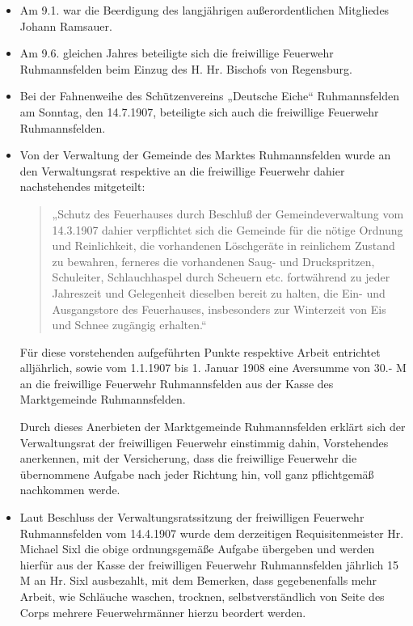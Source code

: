 \documentclass[12pt,a4paper]{book}
\begin{document}
\begin{itemize}
\item Am 9.1. war die Beerdigung des langjährigen außerordentlichen Mitgliedes
Johann Ramsauer.

\item Am 9.6. gleichen Jahres beteiligte sich die freiwillige Feuerwehr
Ruhmannsfelden beim Einzug des H. Hr. Bischofs von Regensburg.

\item Bei der Fahnenweihe des Schützenvereins „Deutsche Eiche“ Ruhmannsfelden am
Sonntag, den 14.7.1907, beteiligte sich auch die freiwillige Feuerwehr
Ruhmannsfelden.

\item Von der Verwaltung der Gemeinde des Marktes Ruhmannsfelden wurde an den
Verwaltungsrat respektive an die freiwillige Feuerwehr dahier nachstehendes
mitgeteilt:


\begin{quote}
„Schutz des Feuerhauses durch Beschluß der Gemeindeverwaltung vom 14.3.1907
dahier verpflichtet sich die Gemeinde für die nötige Ordnung und Reinlichkeit,
die vorhandenen Löschgeräte in reinlichem Zustand zu bewahren, ferneres die
vorhandenen Saug- und Druckspritzen, Schuleiter, Schlauchhaspel durch Scheuern
etc. fortwährend zu jeder Jahreszeit und Gelegenheit dieselben bereit zu halten,
die Ein- und Ausgangstore des Feuerhauses, insbesonders zur Winterzeit von Eis
und Schnee zugängig erhalten.“
\end{quote}

Für diese vorstehenden aufgeführten Punkte respektive Arbeit entrichtet
alljährlich, sowie vom 1.1.1907 bis 1. Januar 1908 eine Aversumme von 30.- M an
die freiwillige Feuerwehr Ruhmannsfelden aus der Kasse des Marktgemeinde
Ruhmannsfelden.

Durch dieses Anerbieten der Marktgemeinde Ruhmannsfelden erklärt sich der
Verwaltungsrat der freiwilligen Feuerwehr einstimmig dahin, Vorstehendes
anerkennen, mit der Versicherung, dass die freiwillige Feuerwehr die übernommene
Aufgabe nach jeder Richtung hin, voll ganz pflichtgemäß nachkommen werde.

\item Laut Beschluss der Verwaltungsratssitzung der freiwilligen Feuerwehr
Ruhmannsfelden vom 14.4.1907 wurde dem derzeitigen Requisitenmeister Hr. Michael
Sixl die obige ordnungsgemäße Aufgabe übergeben und werden hierfür aus der Kasse
der freiwilligen Feuerwehr Ruhmannsfelden jährlich 15 M an Hr. Sixl ausbezahlt,
mit dem Bemerken, dass gegebenenfalls mehr Arbeit, wie Schläuche waschen,
trocknen, selbstverständlich von Seite des Corps mehrere Feuerwehrmänner hierzu
beordert werden.


\end{itemize}
\end{document}
